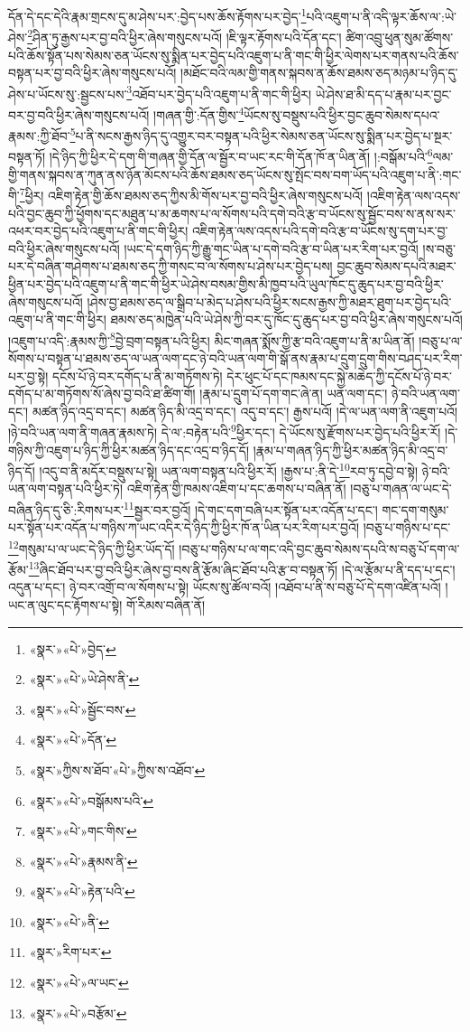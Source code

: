 དོན་དེ་དང་དེའི་རྣམ་གྲངས་དུ་མ་ཤེས་པར་:བྱེད་པས་ཆོས་རྟོགས་པར་བྱེད་\footnote{«སྣར་»«པེ་»བྱེད་}པའི་འཇུག་པ་ནི་འདི་ལྟར་ཆོས་ལ་:ཡེ་ཤེས་\footnote{«སྣར་»«པེ་»ཡེ་ཤེས་ནི་}ཤིན་ཏུ་རྒྱས་པར་བྱ་བའི་ཕྱིར་ཞེས་གསུངས་པའོ། །ཇི་ལྟར་རྟོགས་པའི་དོན་དང་། ཚིག་འབྲུ་ཕུན་སུམ་ཚོགས་པའི་ཆོས་སྟོན་པས་སེམས་ཅན་ཡོངས་སུ་སྨིན་པར་བྱེད་པའི་འཇུག་པ་ནི་གང་གི་ཕྱིར་ལེགས་པར་གནས་པའི་ཆོས་བསྟན་པར་བྱ་བའི་ཕྱིར་ཞེས་གསུངས་པའོ། །མཐོང་བའི་ལམ་གྱི་གནས་སྐབས་ན་ཆོས་ཐམས་ཅད་མཉམ་པ་ཉིད་དུ་ཤེས་པ་ཡོངས་སུ་:སྦྱངས་པས་\footnote{«སྣར་»«པེ་»སྦྱོང་བས་}འཐོབ་པར་བྱེད་པའི་འཇུག་པ་ནི་གང་གི་ཕྱིར། ཡེ་ཤེས་ཐ་མི་དད་པ་རྣམ་པར་བྱང་བར་བྱ་བའི་ཕྱིར་ཞེས་གསུངས་པའོ། །གཞན་གྱི་:དོན་གྱིས་\footnote{«སྣར་»«པེ་»དོན་}ཡོངས་སུ་བསྡུས་པའི་ཕྱིར་བྱང་ཆུབ་སེམས་དཔའ་རྣམས་:ཀྱི་ཐོབ་\footnote{«སྣར་»ཀྱིས་ས་ཐོབ་«པེ་»ཀྱིས་ས་འཐོབ་}པ་ནི་སངས་རྒྱས་ཉིད་དུ་འགྱུར་བར་བསྟན་པའི་ཕྱིར་སེམས་ཅན་ཡོངས་སུ་སྨིན་པར་བྱེད་པ་སྔར་བསྟན་ཏོ། །དེ་ཉིད་ཀྱི་ཕྱིར་དེ་དག་གི་གཞན་གྱི་དོན་ལ་སྦྱོར་བ་ཡང་རང་གི་དོན་ཁོ་ན་ཡིན་ནོ། །:བསྒོམ་པའི་\footnote{«སྣར་»«པེ་»བསྒོམས་པའི་}ལམ་གྱི་གནས་སྐབས་ན་ཀུན་ནས་ཉོན་མོངས་པའི་ཆོས་ཐམས་ཅད་ཡོངས་སུ་སྤོང་བས་བག་ཡོད་པའི་འཇུག་པ་ནི་:གང་གི་\footnote{«སྣར་»«པེ་»གང་གིས་}ཕྱིར། འཇིག་རྟེན་གྱི་ཆོས་ཐམས་ཅད་ཀྱིས་མི་གོས་པར་བྱ་བའི་ཕྱིར་ཞེས་གསུངས་པའོ། །འཇིག་རྟེན་ལས་འདས་པའི་བྱང་ཆུབ་ཀྱི་ཕྱོགས་དང་མཐུན་པ་མ་ཆགས་པ་ལ་སོགས་པའི་དགེ་བའི་རྩ་བ་ཡོངས་སུ་སྦྱོང་བས་ས་ནས་སར་འཕར་བར་བྱེད་པའི་འཇུག་པ་ནི་གང་གི་ཕྱིར། འཇིག་རྟེན་ལས་འདས་པའི་དགེ་བའི་རྩ་བ་ཡོངས་སུ་དག་པར་བྱ་བའི་ཕྱིར་ཞེས་གསུངས་པའོ། །ཡང་དེ་དག་ཉིད་ཀྱི་རྒྱུ་གང་ཡིན་པ་དགེ་བའི་རྩ་བ་ཡིན་པར་རིག་པར་བྱའོ། །ས་བཅུ་པར་དེ་བཞིན་གཤེགས་པ་ཐམས་ཅད་ཀྱི་གསང་བ་ལ་སོགས་པ་ཤེས་པར་བྱེད་པས། བྱང་ཆུབ་སེམས་དཔའི་མཐར་ཕྱིན་པར་བྱེད་པའི་འཇུག་པ་ནི་གང་གི་ཕྱིར་ཡེ་ཤེས་བསམ་གྱིས་མི་ཁྱབ་པའི་ཡུལ་ཁོང་དུ་ཆུད་པར་བྱ་བའི་ཕྱིར་ཞེས་གསུངས་པའོ། །ཤེས་བྱ་ཐམས་ཅད་ལ་སྒྲིབ་པ་མེད་པ་ཤེས་པའི་ཕྱིར་སངས་རྒྱས་ཀྱི་མཐར་ཐུག་པར་བྱེད་པའི་འཇུག་པ་ནི་གང་གི་ཕྱིར། ཐམས་ཅད་མཁྱེན་པའི་ཡེ་ཤེས་ཀྱི་བར་དུ་ཁོང་དུ་ཆུད་པར་བྱ་བའི་ཕྱིར་ཞེས་གསུངས་པའོ། །འཇུག་པ་འདི་:རྣམས་ཀྱི་\footnote{«སྣར་»«པེ་»རྣམས་ནི་}བྱེ་བྲག་བསྟན་པའི་ཕྱིར། མིང་གཞན་སྨོས་ཀྱི་རྩ་བའི་འཇུག་པ་ནི་མ་ཡིན་ནོ། །བཅུ་པ་ལ་སོགས་པ་བསྟན་པ་ཐམས་ཅད་ལ་ཡན་ལག་དང་ཉེ་བའི་ཡན་ལག་གི་སྒོ་ནས་རྣམ་པ་དྲུག་དྲུག་གིས་བཤད་པར་རིག་པར་བྱ་སྟེ། དངོས་པོ་ཉེ་བར་དགོད་པ་ནི་མ་གཏོགས་ཏེ། དེར་ཕུང་པོ་དང་ཁམས་དང་སྐྱེ་མཆེད་ཀྱི་དངོས་པོ་ཉེ་བར་དགོད་པ་མ་གཏོགས་སོ་ཞེས་བྱ་བའི་ཐ་ཚིག་གོ། །རྣམ་པ་དྲུག་པོ་དག་གང་ཞེ་ན། ཡན་ལག་དང་། ཉེ་བའི་ཡན་ལག་དང་། མཚན་ཉིད་འདྲ་བ་དང་། མཚན་ཉིད་མི་འདྲ་བ་དང་། འདུ་བ་དང་། རྒྱས་པའོ། །དེ་ལ་ཡན་ལག་ནི་འཇུག་པའོ། །ཉེ་བའི་ཡན་ལག་ནི་གཞན་རྣམས་ཏེ། དེ་ལ་:བརྟེན་པའི་\footnote{«སྣར་»«པེ་»རྟེན་པའི་}ཕྱིར་དང་། དེ་ཡོངས་སུ་རྫོགས་པར་བྱེད་པའི་ཕྱིར་རོ། །དེ་གཉིས་ཀྱི་འཇུག་པ་ཉིད་ཀྱི་ཕྱིར་མཚན་ཉིད་དང་འདྲ་བ་ཉིད་དོ། །རྣམ་པ་གཞན་ཉིད་ཀྱི་ཕྱིར་མཚན་ཉིད་མི་འདྲ་བ་ཉིད་དོ། །འདུ་བ་ནི་མདོར་བསྡུས་པ་སྟེ། ཡན་ལག་བསྟན་པའི་ཕྱིར་རོ། །རྒྱས་པ་:ནི་དེ་\footnote{«སྣར་»«པེ་»ནི་}རབ་ཏུ་དབྱེ་བ་སྟེ། ཉེ་བའི་ཡན་ལག་བསྟན་པའི་ཕྱིར་ཏེ། འཇིག་རྟེན་གྱི་ཁམས་འཇིག་པ་དང་ཆགས་པ་བཞིན་ནོ། །བཅུ་པ་གཞན་ལ་ཡང་དེ་བཞིན་ཉིད་དུ་ཅི་:རིགས་པར་\footnote{«སྣར་»རིག་པར་}སྦྱར་བར་བྱའོ། །དེ་གང་དག་བཞི་པར་སྟོན་པར་འདོན་པ་དང་། གང་དག་གསུམ་པར་སྟོན་པར་འདོན་པ་གཉིས་ཀ་ཡང་འདིར་དེ་ཉིད་ཀྱི་ཕྱིར་ཁོ་ན་ཡིན་པར་རིག་པར་བྱའོ། །བཅུ་པ་གཉིས་པ་དང་\footnote{«སྣར་»«པེ་»ལ་ཡང་}གསུམ་པ་ལ་ཡང་དེ་ཉིད་ཀྱི་ཕྱིར་ཡོད་དོ། །བཅུ་པ་གཉིས་པ་ལ་གང་འདི་བྱང་ཆུབ་སེམས་དཔའི་ས་བཅུ་པོ་དག་ལ་རྩོམ་\footnote{«སྣར་»«པེ་»བརྩོམ་}ཞིང་ཐོབ་པར་བྱ་བའི་ཕྱིར་ཞེས་བྱ་བས་ནི་རྩོམ་ཞིང་ཐོབ་པའི་རྩ་བ་བསྟན་ཏོ། །དེ་ལ་རྩོམ་པ་ནི་དད་པ་དང་། འདུན་པ་དང་། ཉེ་བར་འགྲོ་བ་ལ་སོགས་པ་སྟེ། ཡོངས་སུ་ཚོལ་བའོ། །འཐོབ་པ་ནི་ས་བཅུ་པོ་དེ་དག་འཛིན་པའོ། །ཡང་ན་ལུང་དང་རྟོགས་པ་སྟེ། གོ་རིམས་བཞིན་ནོ། 